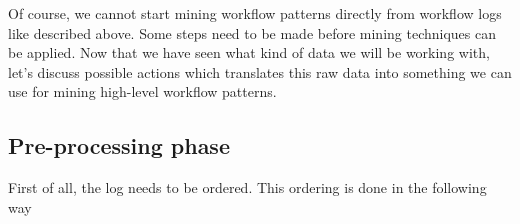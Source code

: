 \documentclass[a4paper,11pt]{article}
\begin{document}
\begin{table}[H]
\centering
\caption{Sequences of workflow with ID 1, based on the workflow log in Table \ref{table:log}.}
\label{table:example_sequences}
\end{table}

Of course, we cannot start mining workflow patterns directly from workflow logs like described above. Some steps need to be made before mining techniques can be applied. Now that we have seen what kind of data we will be working with, let's discuss possible actions which translates this raw data into something we can use for mining high-level workflow patterns.

\subsection{Pre-processing phase}
First of all, the log needs to be ordered. This ordering is done in the following way
\end{document}
